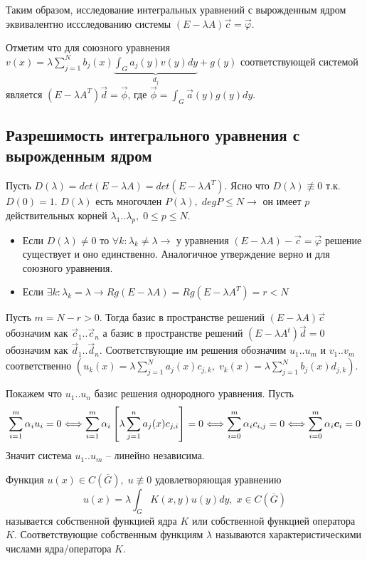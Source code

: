 Таким образом, исследование интегральных уравнений с вырожденным ядром эквивалентно иссследованию системы $(E -\lambda A)\vec{c} = \vec{\varphi}$.

\begin{offtop}
Отметим что для союзного уравнения $v(x) = \lambda \sum_{j = 1}^{N}b_{j}(x)\underbrace{\int_{G}a_{j}(y)v(y)dy}_{d_{j}} + g(y)$ соответствующей системой является $(E - \lambda A^{T})\vec{d}=\vec{\phi}$, где $\vec{\phi}=\int_{G}\vec{a}(y)g(y)dy$.
\end{offtop}

\subsection{Разрешимость интегрального уравнения с вырожденным ядром}
Пусть $D(\lambda) = det(E - \lambda A) = det(E - \lambda A^{T})$. Ясно что $D(\lambda) \not\equiv 0$ т.к. $D(0) = 1$. $D(\lambda)$ есть многочлен $P(\lambda), \; degP \leq N \longrightarrow$ он имеет $p$ действительных корней $\lambda_{1}..\lambda_{p},\; 0 \leq p \leq N$.
\begin{itemize}
  \item Если $D(\lambda) \neq 0$ то $\forall k: \lambda_{k} \neq \lambda \longrightarrow$ у уравнения $(E - \lambda A)-\vec{c} = \vec{\varphi}$ решение существует и оно единственно. Аналогичное утверждение верно и для союзного уравнения.
  \item Если $\exists k: \lambda_{k} = \lambda \rightarrow Rg(E - \lambda A) = Rg(E - \lambda A^{T}) = r < N$
\end{itemize}

Пусть $m = N - r > 0$. Тогда базис в пространстве решений $(E - \lambda A)\vec{c}$ обозначим как $\vec{c}_{1}..\vec{c}_{n}$ а базис в пространстве решений $(E - \lambda A^{t})\vec{d}=0$ обозначим как $\vec{d}_{1}..\vec{d}_{n}$. Соответствующие им решения обозначим $u_{1}..u_{m}$ и $v_{1}..v_{m}$ соответственно $(u_{k}(x) = \lambda \sum_{j = 1}^{N}a_{j}(x)c_{j,k}, \; v_{k}(x) = \lambda \sum_{j = 1}^{N}b_{j}(x)d_{j,k})$.

Покажем что $u_{1}..u_{n}$ базис решения однородного уравнения. Пусть
$$\sum_{i=1}^{m}\alpha_{i}u_{i} = 0 \Longleftrightarrow \sum_{i=1}^{m}\alpha_{i}\left[\lambda\sum_{j=1}^{n}a_{j}(x)c_{j,i}\right] = 0 \Longleftrightarrow \sum_{i=0}^{m}\alpha_{i}c_{i,j} = 0 \Longleftrightarrow \sum_{i=0}^{m}\alpha_{i}\boldsymbol{c}_{i} = 0$$
Значит система $u_{1}..u_{m}$ -- линейно независима.

\begin{definition}
Функция $u(x) \in C(\overline{G}), \; u \not\equiv 0$ удовлетворяющая уравнению
$$u(x) = \lambda \int_{G}K(x,y)u(y)dy, \; x \in C(\overline{G})$$
называется собственной функцией ядра $K$ или собственной функцией оператора $K$. Соответствующие собственным функциям $\lambda$ называются характеристическими числами ядра/оператора $K$.
\end{definition}

